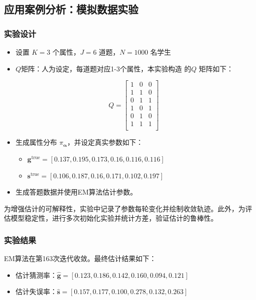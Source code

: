 \documentclass[a4paper,12pt]{ctexart} %
\begin{document}
\subsection{应用案例分析：模拟数据实验}

\subsubsection{实验设计}

\begin{itemize}
  \item 设置 $K=3$ 个属性，$J=6$ 道题，$N=1000$ 名学生
  \item $Q$矩阵：人为设定，每道题对应1-3个属性，本实验构造 的$Q$ 矩阵如下：

\[
Q = \begin{bmatrix}
1 & 0 & 0 \\
1 & 1 & 0 \\
0 & 1 & 1 \\
1 & 0 & 1 \\
0 & 1 & 0 \\
1 & 1 & 1 \\
\end{bmatrix}
\]
\item 生成属性分布 $\pi_{\boldsymbol{\alpha}}$，并设定真实参数如下：
\begin{itemize}
      \item $\boldsymbol{g}^{\text{true}} = [0.137, 0.195, 0.173, 0.16,  0.116, 0.116]$
      \item $\boldsymbol{s}^{\text{true}} = [0.106, 0.187, 0.16,  0.171, 0.102, 0.197]$
\end{itemize}
\item 生成答题数据并使用EM算法估计参数。
\end{itemize}

为增强估计的可解释性，实验中记录了参数每轮变化并绘制收敛轨迹。此外，为评估模型稳定性，进行多次初始化实验并统计方差，验证估计的鲁棒性。

\subsubsection{实验结果}

EM算法在第163次迭代收敛。最终估计结果如下：

\begin{itemize}
    \item 估计猜测率：$\hat{\boldsymbol{g}} = [0.123, 0.186, 0.142, 0.160, 0.094, 0.121]$
    \item 估计失误率：$\hat{\boldsymbol{s}} = [0.157, 0.177, 0.100, 0.278, 0.132, 0.263]$
\end{itemize}
\end{document}
